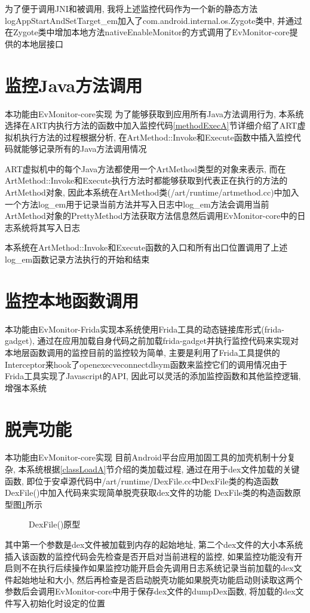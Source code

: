 为了便于调用JNI和被调用, 我将上述监控代码作为一个新的静态方法logAppStartAndSetTarget\_em加入了com.android.internal.os.Zygote类中, 并通过在Zygote类中增加本地方法nativeEnableMonitor的方式调用了EvMonitor-core提供的本地层接口\juhao 

\section{监控Java方法调用}
本功能由EvMonitor-core实现\juhao 
为了能够获取到应用所有Java方法调用行为, 本系统选择在ART内执行方法的函数中加入监控代码\juhao  \ref{methodExecA}节详细介绍了ART虚拟机执行方法的过程\juhao 根据分析, 在ArtMethod::Invoke和Execute函数中插入监控代码就能够记录所有的Java方法调用情况\juhao  

ART虚拟机中的每个Java方法都使用一个ArtMethod类型的对象来表示, 而在ArtMethod::Invoke和Execute执行方法时都能够获取到代表正在执行的方法的ArtMethod对象, 因此本系统在ArtMethod类(/art/runtime/artmethod.cc)中加入一个方法log\_em用于记录当前方法并写入日志中\juhao log\_em方法会调用当前ArtMethod对象的PrettyMethod方法获取方法信息然后调用EvMonitor-core中的日志系统将其写入日志\juhao 

本系统在ArtMethod::Invoke和Execute函数的入口和所有出口位置调用了上述log\_em函数记录方法执行的开始和结束\juhao 

\section{监控本地函数调用}
本功能由EvMonitor-Frida实现\juhao 本系统使用Frida工具的动态链接库形式(frida-gadget), 通过在应用加载自身代码之前加载frida-gadget并执行监控代码来实现对本地层函数调用的监控\juhao 目前的监控较为简单, 主要是利用了Frida工具提供的Interceptor来hook了open\dunhao execve\dunhao connect\dunhao dlsym函数来监控它们的调用情况\juhao 由于Frida工具实现了Javascript的API, 因此可以灵活的添加监控函数和其他监控逻辑, 增强本系统\juhao 


\section{脱壳功能}
本功能由EvMonitor-core实现\juhao 
目前Android平台应用加固工具的加壳机制十分复杂, 本系统根据\ref{classLoadA}节介绍的类加载过程, 通过在用于dex文件加载的关键函数, 即位于安卓源代码中/art/runtime/DexFile.cc中DexFile类的构造函数DexFile()中加入代码来实现简单脱壳获取dex文件的功能\juhao 
DexFile类的构造函数原型图\ref{dexFileCode}所示\juhao 
\begin{figure}[ht]
	\centering
	\caption{DexFile()原型}
	\label{dexFileCode}
\end{figure}
其中第一个参数是dex文件被加载到内存的起始地址, 第二个dex文件的大小\juhao 本系统插入该函数的监控代码会先检查是否开启对当前进程的监控, 如果监控功能没有开启则不在执行后续操作\juhao 如果监控功能开启会先调用日志系统记录当前加载的dex文件起始地址和大小, 然后再检查是否启动脱壳功能\juhao 如果脱壳功能启动则读取这两个参数后会调用EvMonitor-core中用于保存dex文件的dumpDex函数, 将加载的dex文件写入初始化时设定的位置\juhao 


